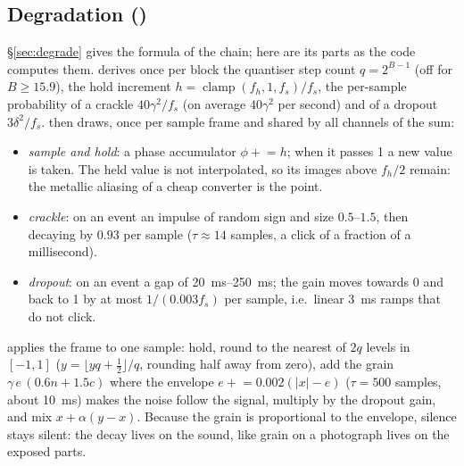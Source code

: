 \subsection{Degradation ()}
\label{sec:math-degrade}
\S\ref{sec:degrade} gives the formula of the chain; here are its parts as the code computes them.
 derives once per block the quantiser step count $q = 2^{B-1}$ (off for
$B\ge 15.9$), the hold increment $h = \operatorname{clamp}(f_h, 1, f_s)/f_s$, the per-sample probability of a crackle
$40\gamma^2/f_s$ (on average $40\gamma^2$ per second) and of a dropout $3\delta^2/f_s$.
 then draws, once per sample frame and shared by all channels of the sum:
\begin{itemize}[nosep]
  \item \emph{sample and hold}: a phase accumulator $\phi \mathrel{+}= h$; when it passes 1 a new value is taken. The
    held value is not interpolated, so its images above $f_h/2$ remain: the metallic aliasing of a cheap converter is
    the point.
  \item \emph{crackle}: on an event an impulse of random sign and size $0.5$--$1.5$, then decaying by $0.93$ per sample
    ($\tau\approx14$ samples, a click of a fraction of a millisecond).
  \item \emph{dropout}: on an event a gap of \SIrange{20}{250}{ms}; the gain moves towards 0 and back to 1 by at most
    $1/(0.003f_s)$ per sample, i.e.\ linear \SI{3}{ms} ramps that do not click.
\end{itemize}
 applies the frame to one sample: hold, round to the nearest of $2q$ levels in $[-1,1]$
($y = \lfloor yq + \tfrac12\rfloor/q$, rounding half away from zero), add the grain
$\gamma\,e\,(0.6n + 1.5c)$ where the envelope $e \mathrel{+}= 0.002(|x|-e)$ ($\tau = 500$ samples, about
\SI{10}{ms}) makes the noise follow the signal, multiply by the dropout gain, and mix
$x + \alpha(y-x)$. Because the grain is proportional to the envelope, silence stays silent: the decay lives on the
sound, like grain on a photograph lives on the exposed parts.
